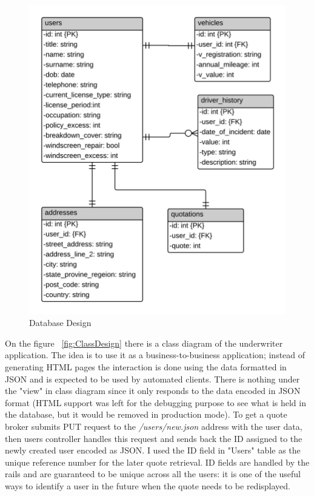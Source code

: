 \documentclass[10pt,a4paper,headinclude=true,twoside]{report}
\begin{document}
\begin{figure}[H]
\centering
\centerline{\includegraphics[scale=0.198]{./DatabaseDesign}}
\caption{Database Design}
\label{fig:DatabaseDesign}
\end{figure}

On the figure ~\ref{fig:ClassDesign} there is a class diagram of the underwriter application. The idea is to use it as a business-to-business application; instead of generating HTML pages the interaction is done using the data formatted in JSON and is expected to be used by automated clients. There is nothing under the "view" in class diagram since it only responds to the data encoded in JSON format (HTML support was left for the debugging purpose to see what is held in the database, but it would be removed in production mode). To get a quote broker submits PUT request to the \textit{/users/new.json} address with the user data, then users controller handles this request and sends back the ID assigned to the newly created user encoded as JSON. I used the ID field in "Users" table as the unique reference number for the later quote retrieval. ID fields are handled by the rails and are guaranteed to be unique across all the users: it is one of the useful ways to identify a user in the future when the quote needs to be redisplayed. 
\end{document}
